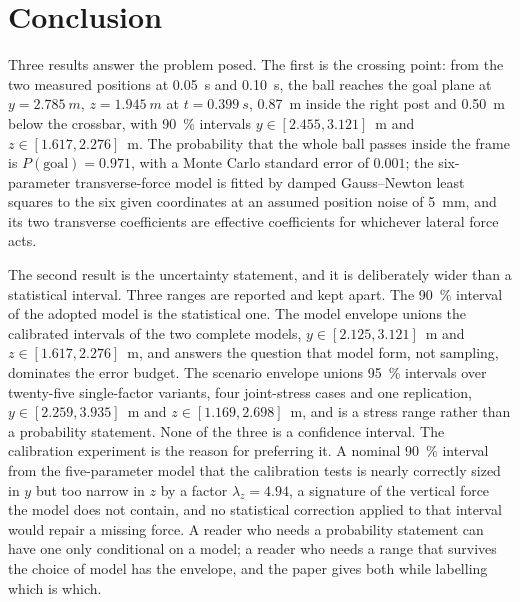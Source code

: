 \section{Conclusion}
\label{sec:conclusion}

Three results answer the problem posed. The first is the crossing point: from
the two measured positions at \SI{0.05}{s} and \SI{0.10}{s}, the ball reaches
the goal plane at $y=\SI{2.785}{m}$, $z=\SI{1.945}{m}$ at
$t=\SI{0.399}{s}$, \SI{0.87}{m} inside the right post and \SI{0.50}{m} below
the crossbar, with \SI{90}{\percent} intervals $y\in[2.455,3.121]$~m and
$z\in[1.617,2.276]$~m. The probability that the whole ball passes inside the
frame is $P(\text{goal}) = 0.971$, with a Monte Carlo standard error of
$0.001$; the six-parameter transverse-force model is fitted by damped
Gauss--Newton least squares to the six given coordinates at an assumed position
noise of \SI{5}{mm}, and its two transverse coefficients are effective
coefficients for whichever lateral force acts.

The second result is the uncertainty statement, and it is deliberately wider
than a statistical interval. Three ranges are reported and kept apart. The
\SI{90}{\percent} interval of the adopted model is the statistical one. The
model envelope unions the calibrated intervals of the two complete models,
$y\in[2.125,3.121]$~m and $z\in[1.617,2.276]$~m, and answers the question that
model form, not sampling, dominates the error budget. The scenario envelope
unions \SI{95}{\percent} intervals over twenty-five single-factor variants, four
joint-stress cases and one replication, $y\in[2.259,3.935]$~m and
$z\in[1.169,2.698]$~m, and is a stress range rather than a probability
statement. None of the three is a confidence interval. The calibration
experiment is the reason for preferring it. A nominal \SI{90}{\percent}
interval from the five-parameter model that the calibration tests is nearly
correctly sized in $y$ but too narrow in $z$ by a factor $\lambda_z=4.94$, a signature of the vertical force the
model does not contain, and no statistical correction applied to that interval
would repair a missing force. A reader who needs a probability statement can
have one only conditional on a model; a reader who needs a range that survives
the choice of model has the envelope, and the paper gives both while labelling
which is which.

